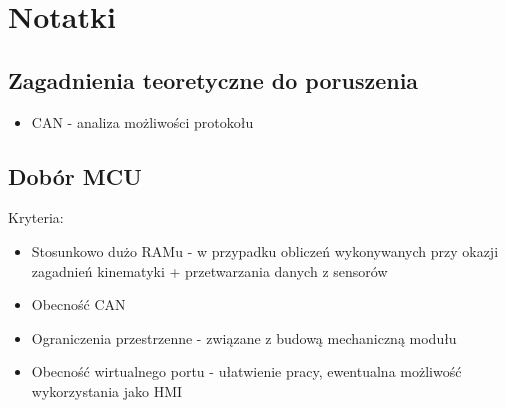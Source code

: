 

\chapter{Notatki}
\section{Zagadnienia teoretyczne do poruszenia}
\begin{itemize}
    \item CAN - analiza możliwości protokołu
\end{itemize}
\section{Dobór MCU}
Kryteria:
    \begin{itemize}
        \item Stosunkowo dużo RAMu - w przypadku obliczeń wykonywanych przy okazji zagadnień kinematyki + przetwarzania danych z sensorów
        \item Obecność CAN 
        \item Ograniczenia przestrzenne - związane z budową mechaniczną modułu
        \item Obecność wirtualnego portu - ułatwienie pracy, ewentualna możliwość wykorzystania jako HMI
    \end{itemize}
